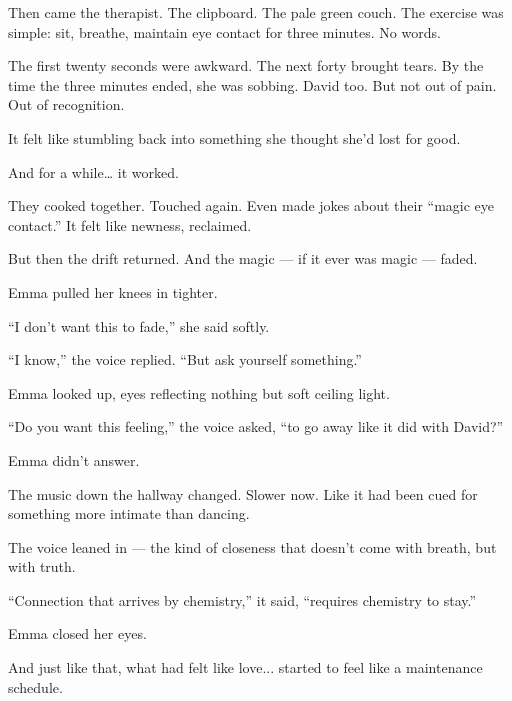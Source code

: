 Then came the therapist. The clipboard. The pale green couch.
The exercise was simple: sit, breathe, maintain eye contact for three minutes. No words.

The first twenty seconds were awkward.
The next forty brought tears.
By the time the three minutes ended, she was sobbing. David too. But not out of pain.
Out of recognition.

It felt like stumbling back into something she thought she’d lost for good.

And for a while… it worked.

They cooked together. Touched again.
Even made jokes about their ``magic eye contact.''
It felt like newness, reclaimed.

But then the drift returned.
And the magic — if it ever was magic — faded.

Emma pulled her knees in tighter.

``I don’t want this to fade,'' she said softly.

``I know,'' the voice replied. ``But ask yourself something.''

Emma looked up, eyes reflecting nothing but soft ceiling light.

``Do you want this feeling,'' the voice asked, ``to go away like it did with David?''

Emma didn’t answer.

The music down the hallway changed. Slower now. Like it had been cued for something 
more intimate 
than dancing.

The voice leaned in — the kind of closeness that doesn’t come with breath, but with truth.

``Connection that arrives by chemistry,'' it said, ``requires chemistry to stay.''

Emma closed her eyes.

And just like that, what had felt like love...
started to feel like a maintenance schedule.


\medskip

